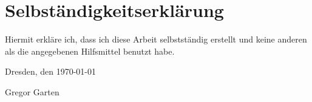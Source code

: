  

\section*{\vfill{} \thispagestyle{empty}
Selbständigkeitserklärung}

Hiermit erkläre ich, dass ich diese Arbeit selbstständig erstellt
und keine anderen als die angegebenen Hilfsmittel benutzt habe.
\bigskip{}

\noindent Dresden, den \today %
\vspace{2.5cm}

\noindent Gregor Garten \cleardoublepage{}